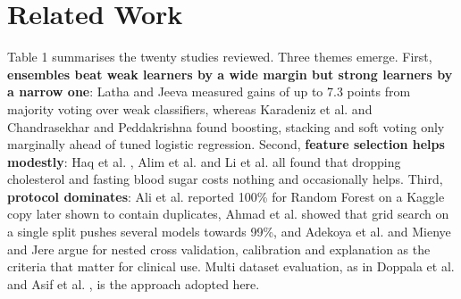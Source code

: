 \documentclass[conference,a4paper,10pt]{IEEEtran}
\begin{document}
\section{Related Work}
Table 1 summarises the twenty studies reviewed. Three themes emerge. First, \textbf{ensembles beat weak learners by a wide margin but strong learners by a narrow one}: Latha and Jeeva \cite{r9} measured gains of up to 7.3 points from majority voting over weak classifiers, whereas Karadeniz et al. \cite{r14} and Chandrasekhar and Peddakrishna \cite{r18} found boosting, stacking and soft voting only marginally ahead of tuned logistic regression. Second, \textbf{feature selection helps modestly}: Haq et al. \cite{r5}, Alim et al. \cite{r7} and Li et al. \cite{r15} all found that dropping cholesterol and fasting blood sugar costs nothing and occasionally helps. Third, \textbf{protocol dominates}: Ali et al. \cite{r11} reported 100\% for Random Forest on a Kaggle copy later shown to contain duplicates, Ahmad et al. \cite{r19} showed that grid search on a single split pushes several models towards 99\%, and Adekoya et al. \cite{r21} and Mienye and Jere \cite{r16} argue for nested cross validation, calibration and explanation as the criteria that matter for clinical use. Multi dataset evaluation, as in Doppala et al. \cite{r6} and Asif et al. \cite{r17}, is the approach adopted here.
\end{document}
